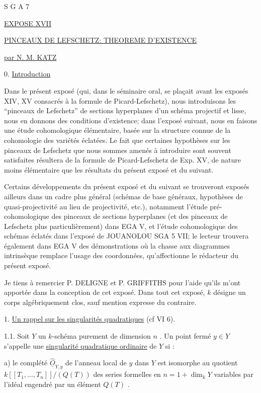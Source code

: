 


S G A 7


\underline{EXPOSE XVII}


\underline{\underline{PINCEAUX DE LEFSCHETZ: THEOREME D'EXISTENCE}}


\underline{par N. M. KATZ}


0. \underline{Introduction}

Dans le présent exposé (qui, dans le séminaire oral, se plaçait avant les exposés XIV, XV consacrés à la formule de Picard-Lefschetz), nous introduisons les ``pinceaux de Lefschetz'' de sections hyperplanes d'un schéma projectif et lisse, nous en donnons des conditions d'existence; dans l'exposé suivant, nous en faisons une étude cohomologique élémentaire, basée sur la structure connue de la cohomologie des variétés éclatées. Le fait que certaines hypothèses sur les pinceaux de Lefschetz que nous sommes amenés à introduire sont souvent satisfaites résultera de la formule de Picard-Lefschetz de Exp. XV, de nature moins élémentaire que les résultats du présent exposé et du suivant.

Certains développements du présent exposé et du suivant se trouveront exposés ailleurs dans un cadre plus général (schémas de base généraux, hypothèses de quasi-projectivité au lieu de projectivité, etc.), notamment l'étude pré-cohomologique des pinceaux de sections hyperplanes (et des pinceaux de Lefschetz plus particulièrement) dans EGA V, et l'étude cohomologique des schémas éclatés dans
l'exposé de JOUANOLOU SGA 5 VII; le lecteur trouvera également dans EGA V des démonstrations où la chasse aux diagrammes intrinsèque remplace l'usage des coordonnées, qu'affectionne le rédacteur du présent exposé.

Je tiens à remercier P. DELIGNE et P. GRIFFITHS pour l'aide qu'ils m'ont apportée dans la conception de cet exposé. Dans tout cet exposé, $k$ désigne un corps algébriquement clos, sauf mention expresse du contraire.


1. \underline{Un rappel sur les singularités quadratiques} (cf VI 6).

1.1. \quad Soit $Y$ un $k$-schéma purement de dimension $n$ . Un point fermé $y \in Y$ s'appelle une \underline{singularité quadratique ordinaire} de $Y$ si :

a) le complété $\hat{\underline{O}}_{Y,y}$ de l'anneau local de $y$ dans $Y$ est isomorphe au quotient $k[[T_1,\ldots,T_n]]/(Q(T))$ des series formelles en $n=1+\dim_k Y$ variables par l'idéal engendré par un élément $Q(T)$ .

